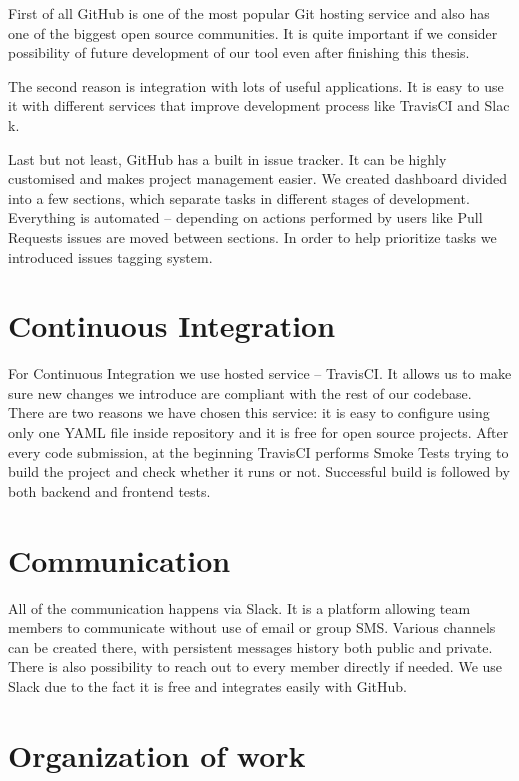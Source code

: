 \documentclass[licencjacka,en]{thesisclass}
\begin{document}
    First of all GitHub \cite{GitHub} is one of the most popular Git hosting service and also has one of the biggest open source communities.
    It is quite important if we consider possibility of future development of our tool even after finishing this thesis.

    The second reason is integration with lots of useful applications.
    It is easy to use it with different services that improve development process like TravisCI \cite{TravisCI} and Slac k\cite{Slack}.

    Last but not least, GitHub has a built in issue tracker.
    It can be highly customised and makes project management easier.
    We created dashboard divided into a few sections, which separate tasks in different stages of development.
    Everything is automated -- depending on actions performed by users like Pull Requests issues are moved between sections.
    In order to help prioritize tasks we introduced issues tagging system.

    \section{Continuous Integration}

    For Continuous Integration we use hosted service -- TravisCI. It allows us to make sure new changes we introduce are compliant with the rest of our codebase.
    There are two reasons we have chosen this service: it is easy to configure using only one YAML file inside repository and it is free for open source projects.
    After every code submission, at the beginning TravisCI performs Smoke Tests trying to build the project and check whether it runs or not.
    Successful build is followed by both backend and frontend tests.

    \section{Communication}

    All of the communication happens via Slack.
    It is a platform allowing team members to communicate without use of email or group SMS.
    Various channels can be created there, with persistent messages history both public and private.
    There is also possibility to reach out to every member directly if needed.
    We use Slack due to the fact it is free and integrates easily with GitHub.

    \section{Organization of work}
\end{document}
